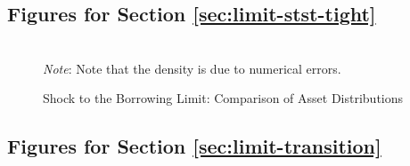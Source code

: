 \documentclass[12pt]{article} %
\numberwithin{equation}{section} %
\numberwithin{figure}{section}
\numberwithin{table}{section}
\begin{document}
\begin{refsection}
\begin{appendices}
\subsection{Figures for Section \ref{sec:limit-stst-tight}}
\label{sec-app:figures-limit-tight}

\begin{sidewaysfigure}
    \caption{Shock to the Borrowing Limit: Comparison
 of Asset Distributions}
    \label{fig:comparison-stst-baseline-dist}
    \centering

    \\
     \centering
	\textit{Note}: Note that the density is due to numerical errors.
\end{sidewaysfigure}

\subsection{Figures for Section \ref{sec:limit-transition}}
\label{sec-app:figures-limit-transition}


\end{appendices}
\end{refsection}
\end{document}
